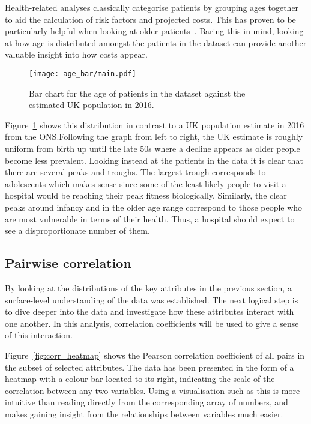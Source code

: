 Health-related analyses classically categorise patients by grouping ages
together to aid the calculation of risk factors and projected costs. This has
proven to be particularly helpful when looking at older
patients~\cite{Billings327}. Baring this in mind, looking at how age is
distributed amongst the patients in the dataset can provide another valuable
insight into how costs appear.

\begin{figure}[htbp]
    \centering
    \texttt{[image: age\_bar/main.pdf]}
    \caption{Bar chart for the age of patients in the dataset against the
        estimated UK population in 2016.}%
    \label{fig:age_bar}
\end{figure}

Figure~\ref{fig:age_bar} shows this distribution in contrast to a UK population
estimate in 2016 from the ONS.\@ Following the graph from left to right, the UK
estimate is roughly uniform from birth up until the late 50s where a decline
appears as older people become less prevalent. Looking instead at the patients
in the data it is clear that there are several peaks and troughs. The largest
trough corresponds to adolescents which makes sense since some of the least
likely people to visit a hospital would be reaching their peak fitness
biologically. Similarly, the clear peaks around infancy and in the older age
range correspond to those people who are most vulnerable in terms of their
health. Thus, a hospital should expect to see a disproportionate number of them.


\subsection{Pairwise correlation}\label{subsec:corr}

By looking at the distributions of the key attributes in the previous section,
a surface-level understanding of the data was established. The next logical step
is to dive deeper into the data and investigate how these attributes interact
with one another. In this analysis, correlation coefficients will be used to
give a sense of this interaction.

Figure~\ref{fig:corr_heatmap} shows the Pearson correlation coefficient of all
pairs in the subset of selected attributes. The data has been presented in the
form of a heatmap with a colour bar located to its right, indicating the scale
of the correlation between any two variables. Using a visualisation such as this
is more intuitive than reading directly from the corresponding array of numbers,
and makes gaining insight from the relationships between variables much easier.

